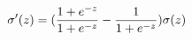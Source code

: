 \documentclass[preview]{standalone}
\begin{document}
\begin{align*}
\special{dvisvgm:raw <g id='unique000'>}\sigma^\prime(z)=(\frac{1+e^{-z}}{1+e^{-z }}-\frac{1}{1+e^{-z}})\sigma(z)\special{dvisvgm:raw </g>}
\end{align*}
\end{document}
